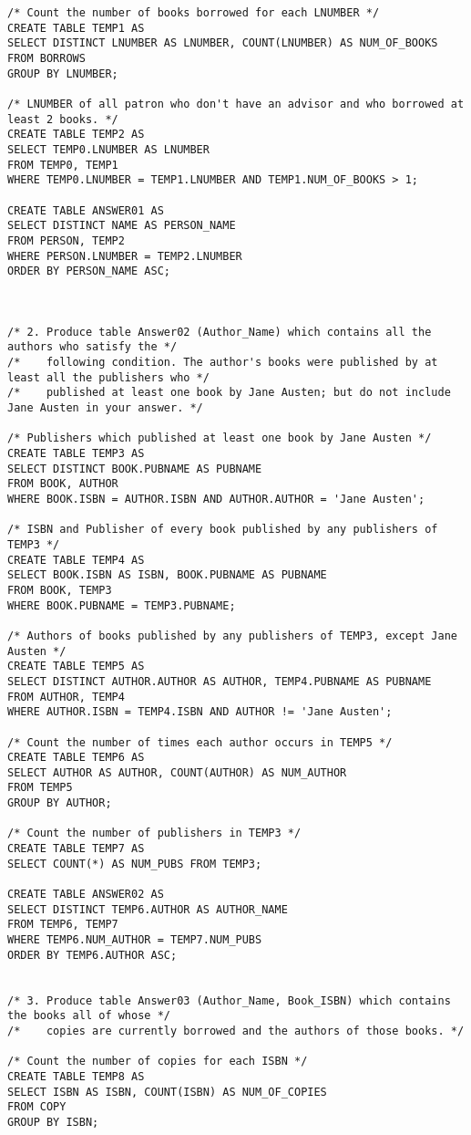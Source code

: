 \documentclass[10pt]{article}
\begin{document}
\begin{verbatim}
/* Count the number of books borrowed for each LNUMBER */
CREATE TABLE TEMP1 AS
SELECT DISTINCT LNUMBER AS LNUMBER, COUNT(LNUMBER) AS NUM_OF_BOOKS
FROM BORROWS
GROUP BY LNUMBER;

/* LNUMBER of all patron who don't have an advisor and who borrowed at least 2 books. */
CREATE TABLE TEMP2 AS
SELECT TEMP0.LNUMBER AS LNUMBER
FROM TEMP0, TEMP1
WHERE TEMP0.LNUMBER = TEMP1.LNUMBER AND TEMP1.NUM_OF_BOOKS > 1;

CREATE TABLE ANSWER01 AS
SELECT DISTINCT NAME AS PERSON_NAME
FROM PERSON, TEMP2
WHERE PERSON.LNUMBER = TEMP2.LNUMBER
ORDER BY PERSON_NAME ASC;



/* 2. Produce table Answer02 (Author_Name) which contains all the authors who satisfy the */
/*    following condition. The author's books were published by at least all the publishers who */
/*    published at least one book by Jane Austen; but do not include Jane Austen in your answer. */

/* Publishers which published at least one book by Jane Austen */
CREATE TABLE TEMP3 AS
SELECT DISTINCT BOOK.PUBNAME AS PUBNAME
FROM BOOK, AUTHOR
WHERE BOOK.ISBN = AUTHOR.ISBN AND AUTHOR.AUTHOR = 'Jane Austen';

/* ISBN and Publisher of every book published by any publishers of TEMP3 */
CREATE TABLE TEMP4 AS
SELECT BOOK.ISBN AS ISBN, BOOK.PUBNAME AS PUBNAME
FROM BOOK, TEMP3
WHERE BOOK.PUBNAME = TEMP3.PUBNAME;

/* Authors of books published by any publishers of TEMP3, except Jane Austen */
CREATE TABLE TEMP5 AS
SELECT DISTINCT AUTHOR.AUTHOR AS AUTHOR, TEMP4.PUBNAME AS PUBNAME
FROM AUTHOR, TEMP4
WHERE AUTHOR.ISBN = TEMP4.ISBN AND AUTHOR != 'Jane Austen';

/* Count the number of times each author occurs in TEMP5 */
CREATE TABLE TEMP6 AS
SELECT AUTHOR AS AUTHOR, COUNT(AUTHOR) AS NUM_AUTHOR
FROM TEMP5
GROUP BY AUTHOR;

/* Count the number of publishers in TEMP3 */
CREATE TABLE TEMP7 AS
SELECT COUNT(*) AS NUM_PUBS FROM TEMP3;

CREATE TABLE ANSWER02 AS
SELECT DISTINCT TEMP6.AUTHOR AS AUTHOR_NAME
FROM TEMP6, TEMP7
WHERE TEMP6.NUM_AUTHOR = TEMP7.NUM_PUBS
ORDER BY TEMP6.AUTHOR ASC;


/* 3. Produce table Answer03 (Author_Name, Book_ISBN) which contains the books all of whose */
/*    copies are currently borrowed and the authors of those books. */

/* Count the number of copies for each ISBN */
CREATE TABLE TEMP8 AS
SELECT ISBN AS ISBN, COUNT(ISBN) AS NUM_OF_COPIES
FROM COPY
GROUP BY ISBN;


\end{verbatim}
\end{document}
